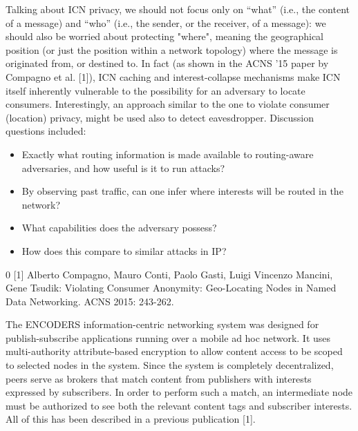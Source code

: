 \documentclass[a4paper,UKenglish]{dagrep}
\begin{document}
\license

Talking about ICN privacy, we should not focus only on ``what'' (i.e., the content of a message) and ``who'' (i.e., the sender, or the receiver, of a message): we should also be worried about protecting "where", meaning the geographical position (or just the position within a network topology) where the message is originated from, or destined to. In fact (as shown in the ACNS '15 paper by Compagno et al. [1]), ICN caching and interest-collapse mechanisms make ICN itself inherently vulnerable to the possibility for an adversary to locate consumers.
Interestingly, an approach similar to the one to violate consumer (location) privacy, might be used also to detect eavesdropper.
Discussion questions included:
\begin{itemize}
\item Exactly what routing information is made available to routing-aware adversaries, and how useful is it to run attacks?
\item By observing past traffic, can one infer where interests will be routed in the network?
\item What capabilities does the adversary possess?
\item How does this compare to similar attacks in IP?
\end{itemize}

\begin{thebibliography}{0}
[1] Alberto Compagno, Mauro Conti, Paolo Gasti, Luigi Vincenzo Mancini, Gene Tsudik:
Violating Consumer Anonymity: Geo-Locating Nodes in Named Data Networking. ACNS 2015: 243-262.
\end{thebibliography}

\license

The ENCODERS information-centric networking system was designed for publish-subscribe applications running over a mobile ad hoc network. It uses multi-authority attribute-based encryption to allow content access to be scoped to selected nodes in the system. Since the system is completely decentralized, peers serve as brokers that match content from publishers with interests expressed by subscribers. In order to perform such a match, an intermediate node must be authorized to see both the relevant content tags and  subscriber interests. All of this has been described in a previous publication [1].
\end{document}
